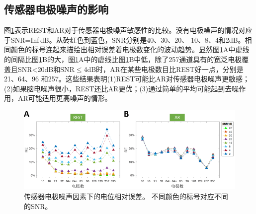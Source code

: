 \subsection{传感器电极噪声的影响}
图\ref{2:noise}表示REST和AR对于传感器电极噪声敏感性的比较。没有电极噪声的情况对应于SNR=Inf$\,$dB。从砖红色到蓝色，SNR分别是40、30、20、
10、8、4和2dB。相同颜色的标号连起来描绘出相对误差着电极数变化的波动趋势。显然图\ref{2:noise}A中虚线的间隔比图\ref{2:noise}B的大，图\ref{2:noise}A中的虚线比图\ref{2:noise}B中低，除了257通道具有的宽泛电极覆盖且SNR<20dB和SNR$\leq$4dB时，AR在某些电极数目比REST好一点，分别是21、64、96
和257。这些结果表明(1)REST可能比AR对传感器电极噪声更敏感；(2)如果脑电噪声很小，REST还比AR更优；(3)通过简单的平均可能起到去噪作用，AR可能适用更高噪声的情形。
\begin{figure}[h!]
	\centering
	\includegraphics[width=15cm]{pic/JNE/figure8.png}
	\caption{传感器电极噪声因素下的电位相对误差。 不同颜色的标号对应不同的SNR。}
	\label{2:noise}
\end{figure}
